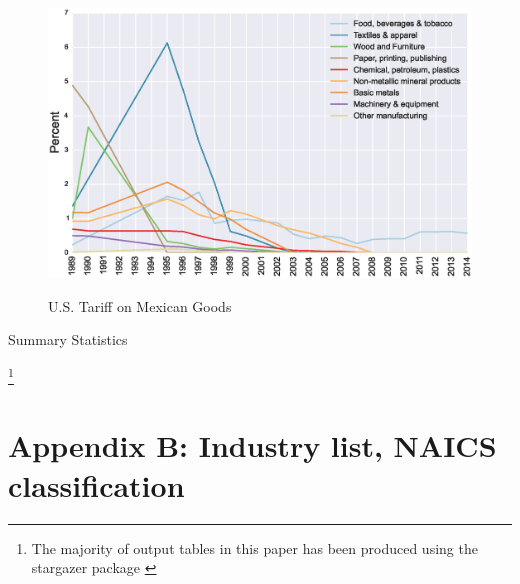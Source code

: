 \begin{figure}[htpb]\centering
\caption{\small U.S. Tariff on Mexican Goods}\vspace{0.2cm}
\includegraphics[scale=0.5]{tau_usa_mex}
\label{fig:usa_mex}
\end{figure}


\begin{center}
\begin{table}

\caption{Summary Statistics}
\label{tab:sumstats}
\end{table}
\end{center}
\footnote{The majority of output tables in this paper has been produced using the stargazer package \citep{Hlavac2014}}

\newpage

\section{Appendix B: Industry list, NAICS classification}

